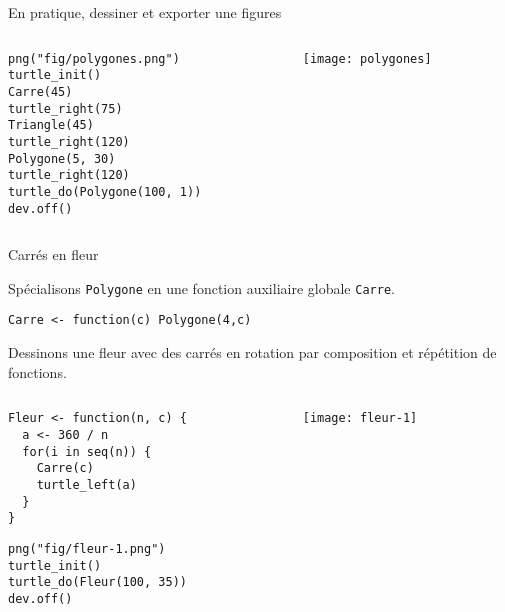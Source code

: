 \documentclass[10pt]{beamer}
\begin{document}
\begin{frame}[fragile]{En pratique, dessiner et exporter une figures}


\begin{columns}[c]
\begin{column}{0.48\textwidth}
  \begin{lstlisting}
png("fig/polygones.png")
turtle_init()
Carre(45)
turtle_right(75)
Triangle(45)
turtle_right(120)
Polygone(5, 30)
turtle_right(120)
turtle_do(Polygone(100, 1))
dev.off()
\end{lstlisting}
\end{column}

\begin{column}{0.48\textwidth}
    \texttt{[image: polygones]}
\end{column}
\end{columns}
\end{frame}

\begin{frame}[fragile]{Carrés en fleur}

  Spécialisons \texttt{Polygone} en une \alert{fonction auxiliaire globale} \texttt{Carre}.
  \begin{lstlisting}[style=editor]
Carre <- function(c) Polygone(4,c)
\end{lstlisting}

Dessinons une fleur avec des carrés en rotation par \alert{composition et répétition de fonctions}.

\begin{columns}[c]
\begin{column}{0.58\textwidth}
  \begin{lstlisting}[style=editor]
Fleur <- function(n, c) {
  a <- 360 / n
  for(i in seq(n)) {
    Carre(c)
    turtle_left(a)
  }
}
\end{lstlisting}

\begin{lstlisting}[linerange=2-3]
png("fig/fleur-1.png")
turtle_init()
turtle_do(Fleur(100, 35))
dev.off()
\end{lstlisting}
\end{column}

\begin{column}{0.38\textwidth}
    \texttt{[image: fleur-1]}
\end{column}
\end{columns}
\end{frame}
\end{document}
